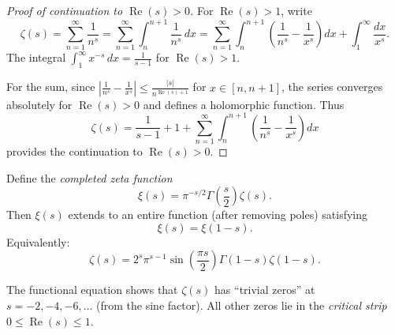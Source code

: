 \begin{proof}[Proof of continuation to $\operatorname{Re}(s) > 0$]
  For $\operatorname{Re}(s) > 1$, write
  \begin{equation}
    \zeta(s) = \sum_{n=1}^{\infty} \frac{1}{n^s} = \sum_{n=1}^{\infty} \int_n^{n+1} \frac{1}{n^s} \, dx = \sum_{n=1}^{\infty} \int_n^{n+1} \left(\frac{1}{n^s} - \frac{1}{x^s}\right) dx + \int_1^{\infty} \frac{dx}{x^s}.
  \end{equation}
  The integral $\int_1^{\infty} x^{-s} \, dx = \frac{1}{s-1}$ for $\operatorname{Re}(s) > 1$.

  For the sum, since $\left|\frac{1}{n^s} - \frac{1}{x^s}\right| \leq \frac{|s|}{n^{\operatorname{Re}(s)+1}}$ for $x \in [n, n+1]$, the series converges absolutely for $\operatorname{Re}(s) > 0$ and defines a holomorphic function. Thus
  \begin{equation}
    \zeta(s) = \frac{1}{s-1} + 1 + \sum_{n=1}^{\infty} \int_n^{n+1} \left(\frac{1}{n^s} - \frac{1}{x^s}\right) dx
  \end{equation}
  provides the continuation to $\operatorname{Re}(s) > 0$.
\end{proof}

\begin{theorem}
  Define the \emph{completed zeta function}
  \begin{equation}
    \xi(s) = \pi^{-s/2} \Gamma\left(\frac{s}{2}\right) \zeta(s).
  \end{equation}
  Then $\xi(s)$ extends to an entire function (after removing poles) satisfying
  \begin{equation}
    \xi(s) = \xi(1-s).
  \end{equation}
  Equivalently:
  \begin{equation}
    \zeta(s) = 2^s \pi^{s-1} \sin\left(\frac{\pi s}{2}\right) \Gamma(1-s) \zeta(1-s).
  \end{equation}
\end{theorem}

\begin{remark}
  The functional equation shows that $\zeta(s)$ has ``trivial zeros'' at $s = -2, -4, -6, \ldots$ (from the sine factor). All other zeros lie in the \emph{critical strip} $0 \leq \operatorname{Re}(s) \leq 1$.
\end{remark}

